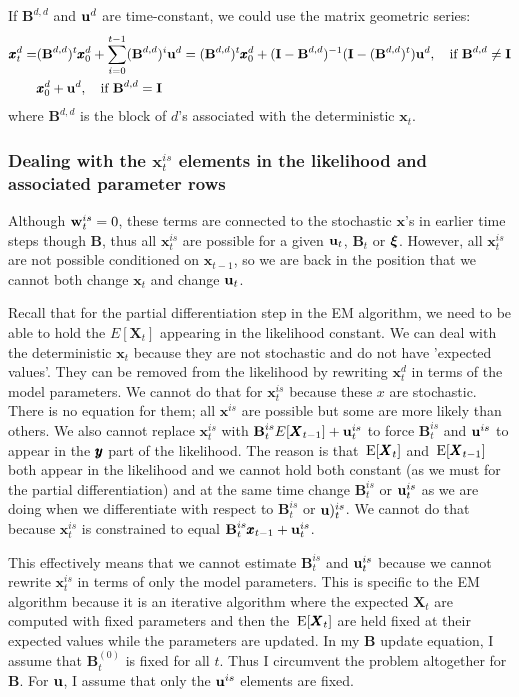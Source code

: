 \documentclass[]{article}
\def\xixi{\mbox{\boldmath $\xi$}}
\def\UPS{\mbox{\boldmath $\Upsilon$}}
\def\BB{\mbox{$\mathbf B$}}	\def\bb{\mbox{$\mathbf b$}} \def\Bb{\mbox{$\mathbf J$}} \def\Ba{\mbox{$\mathbf L$}} \def\Bm{\UPS}
\def\E{\,\textup{\textrm{E}}}
\def\II{\mbox{$\mathbf I$}} \def\ii{\mbox{$\mathbf i$}}
\def\XX{\mbox{$\pmb{X}$}}	\def\xx{\mbox{$\pmb{x}$}}
\begin{document}
If $\BB^{d,d}$ and $\mbox{$\mathbf u$}^d$ are time-constant, we could use the matrix geometric series: 
\begin{equation}\label{eq:xt.geo}
\begin{split}
\xx_t^{d}=&(\BB^{d,d})^t \xx_0^{d} + \sum_{i=0}^{t-1}(\BB^{d,d})^i \uu^{d} = 
(\BB^{d,d})^t \xx_0^{d} + (\II - \BB^{d,d})^{-1}(\II-(\BB^{d,d})^t)\uu^{d}, \quad\text{if }\BB^{d,d} \neq \II\\
&\xx_0^d + \uu^d,\quad\text{if }\BB^{d,d} = \II
\end{split}
\end{equation}
where $\BB^{d,d}$ is the block of $d$'s associated with the deterministic $\xx_t$. 

\subsubsection{Dealing with the $\xx_t^{is}$ elements in the likelihood and associated parameter rows}
Although $\mbox{$\mathbf w$}_t^{is}=0$, these terms are connected to the stochastic $\xx$'s in earlier time steps though $\BB$, thus all $\xx_t^{is}$ are possible for a given $\mbox{$\mathbf u$}_t$, $\BB_t$ or $\xixi$. However, all $\xx_t^{is}$ are not possible conditioned on $\xx_{t-1}$, so we are back in the position that we cannot both change $\xx_t$ and change $\mbox{$\mathbf u$}_t$.

Recall that for the partial differentiation step in the EM algorithm, we need to be able to hold the $E[\XX_t]$ appearing in the likelihood constant.  We can deal with the deterministic $\xx_t$ because they are not stochastic and do not have 'expected values'.  They can be removed from the likelihood by rewriting $\xx_t^d$ in terms of the model parameters.  We cannot do that for $\xx_t^{is}$ because these $x$ are stochastic. There is no equation for them; all $\xx^{is}$ are possible but some are more likely than others.  We also cannot replace $\xx_t^{is}$ with $\BB_t^{is}E[\XX_{t-1}]+\uu_t^{is}$ to force $\BB_t^{is}$ and $\mbox{$\mathbf u$}^{is}$ to appear in the $\mbox{$\pmb{y}$}$ part of the likelihood.  The reason is that $\E[\XX_t]$ and $\E[\XX_{t-1}]$ both appear in the likelihood and we cannot hold both constant (as we must for the partial differentiation) and at the same time change $\BB_t^{is}$ or $\mbox{$\mathbf u$}_t^{is}$ as we are doing when we differentiate with respect to $\BB_t^{is}$ or $\mbox{$\mathbf u$})_t^{is}$.  We cannot do that because  $\xx_t^{is}$ is constrained to equal $\BB_t^{is}\xx_{t-1}+\uu_t^{is}$.

This effectively means that we cannot estimate $\BB_t^{is}$ and $\mbox{$\mathbf u$}_t^{is}$ because we cannot rewrite $\xx_t^{is}$ in terms of only the model parameters.  This is specific to the EM algorithm because it is an iterative algorithm where the expected $\XX_t$ are computed with fixed parameters and then the $\E[\XX_t]$ are held fixed at their expected values while the parameters are updated.  In my $\BB$ update equation, I assume that $\BB_t^{(0)}$ is fixed for all $t$.  Thus I circumvent the problem altogether for $\BB$.  For $\mbox{$\mathbf u$}$, I assume that only the $\mbox{$\mathbf u$}^{is}$ elements are fixed.
\end{document}
